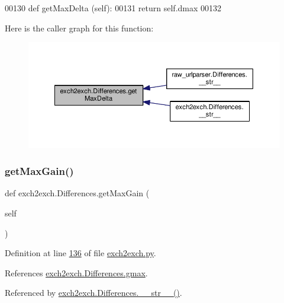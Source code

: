 \begin{DoxyCode}
00130     \textcolor{keyword}{def }getMaxDelta (self): 
00131         \textcolor{keywordflow}{return} self.dmax
00132         
\end{DoxyCode}
Here is the caller graph for this function\+:
\nopagebreak
\begin{figure}[H]
\begin{center}
\leavevmode
\includegraphics[width=350pt]{classexch2exch_1_1_differences_a577c9c2cbc470643f7bff8fc50295816_icgraph}
\end{center}
\end{figure}
\mbox{\label{classexch2exch_1_1_differences_a3b557469ba68c3041d6ef04dc847c77b}} 
\subsubsection{\texorpdfstring{get\+Max\+Gain()}{getMaxGain()}}
{\footnotesize\ttfamily def exch2exch.\+Differences.\+get\+Max\+Gain (\begin{DoxyParamCaption}\item[{}]{self }\end{DoxyParamCaption})}



Definition at line \hyperlink{exch2exch_8py_source_l00136}{136} of file \hyperlink{exch2exch_8py_source}{exch2exch.\+py}.



References \hyperlink{exch2exch_8py_source_l00119}{exch2exch.\+Differences.\+gmax}.



Referenced by \hyperlink{exch2exch_8py_source_l00154}{exch2exch.\+Differences.\+\_\+\+\_\+str\+\_\+\+\_\+()}.



